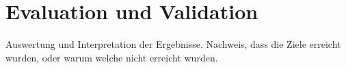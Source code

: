 \chapter{Evaluation und Validation}


Auswertung und Interpretation der Ergebnisse. Nachweis, dass die Ziele erreicht wurden, oder warum welche nicht erreicht wurden.
